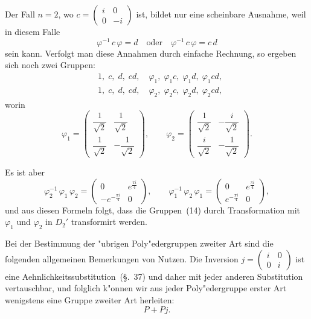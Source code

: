 \documentclass[12pt,a4paper]{article}
\theoremstyle{plain}
\theoremstyle{definition}
\theoremstyle{remark}
\begin{document}
Der Fall $n = 2$, wo $c = \begin{pmatrix} i & 0 \\ 0 & -i \end{pmatrix}$ ist, bildet nur eine scheinbare Ausnahme, weil in diesem Falle
\begin{equation}\tag{13}
\varphi^{-1}\,c\,\varphi = d\quad\text{oder}\quad \varphi^{-1}\,c\,\varphi = c\,d
\end{equation}
sein kann. Verfolgt man diese Annahmen durch einfache Rechnung, so ergeben sich noch zwei Gruppen:
\begin{equation}\tag{14}
\begin{aligned}
&1,\; c,\; d,\; cd,\quad \varphi_{1},\; \varphi_{1}c,\; \varphi_{1}d,\; \varphi_{1}cd, \\
&1,\; c,\; d,\; cd,\quad \varphi_{2},\; \varphi_{2}c,\; \varphi_{2}d,\; \varphi_{2}cd,
\end{aligned}
\end{equation}
worin
\[
\varphi_{1} = \begin{pmatrix} \dfrac{1}{\sqrt{2}} & \dfrac{1}{\sqrt{2}} \\[6pt] \dfrac{1}{\sqrt{2}} & -\dfrac{1}{\sqrt{2}} \end{pmatrix},\qquad
\varphi_{2} = \begin{pmatrix} \dfrac{1}{\sqrt{2}} & -\dfrac{i}{\sqrt{2}} \\[6pt] \dfrac{i}{\sqrt{2}} & -\dfrac{1}{\sqrt{2}} \end{pmatrix}.
\]

Es ist aber
\[
\varphi_{2}^{-1}\,\varphi_{1}\,\varphi_{2} =
\begin{pmatrix} 0 & e^{\frac{\pi i}{4}} \\ -e^{-\frac{\pi i}{4}} & 0 \end{pmatrix},\qquad
\varphi_{1}^{-1}\,\varphi_{2}\,\varphi_{1} =
\begin{pmatrix} 0 & e^{\frac{\pi i}{4}} \\ e^{-\frac{\pi i}{4}} & 0 \end{pmatrix},
\]
und aus diesen Formeln folgt, dass die Gruppen~(14) durch Transformation mit $\varphi_{1}$ und $\varphi_{2}$ in $D_{2}'$ transformirt werden.

Bei der Bestimmung der "ubrigen Poly"edergruppen zweiter Art sind die folgenden allgemeinen Bemerkungen von Nutzen. Die Inversion $j = \begin{pmatrix} i & 0 \\ 0 & i \end{pmatrix}$ ist eine Aehnlichkeitssubstitution~(\S.~37) und daher mit jeder anderen Substitution vertauschbar, und folglich k"onnen wir aus jeder Poly"edergruppe erster Art wenigstens eine Gruppe zweiter Art herleiten:
\begin{equation}\tag{15}
P + Pj.
\end{equation}
\end{document}
